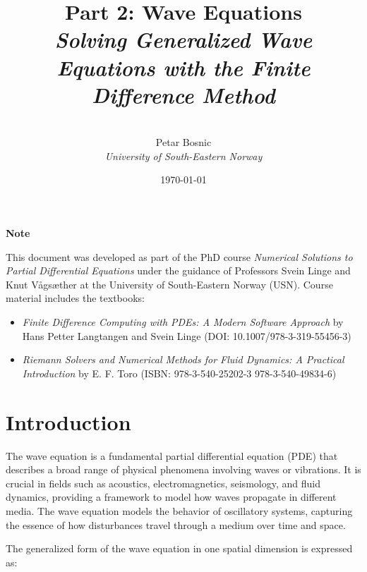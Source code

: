 \documentclass{article}
\title{\textbf{Part 2: Wave Equations
	} \\[0.5em]  %
	\large \textit{Solving Generalized Wave Equations with the Finite Difference Method} \\[2em]  %
}
\author{\\[15em]  %
	Petar Bosnic \\[0.5em] %
	\textit{University of South-Eastern Norway} \\[2em]  %
}
\date{\today}
\begin{document}
	
	\maketitle
	\thispagestyle{empty}  %
	
	\vspace{1cm}
	
	\begin{center}
		\textbf{Note}
	\end{center}
	
	\noindent
	This document was developed as part of the PhD course \textit{Numerical Solutions to Partial Differential Equations} under the guidance of Professors Svein Linge and Knut Vågsæther at the University of South-Eastern Norway (USN). Course material includes the textbooks:
	
	\begin{itemize}
		\item \textit{Finite Difference Computing with PDEs: A Modern Software Approach} by Hans Petter Langtangen and Svein Linge (DOI: 10.1007/978-3-319-55456-3)
		\item \textit{Riemann Solvers and Numerical Methods for Fluid Dynamics: A Practical Introduction} by E. F. Toro (ISBN: 978-3-540-25202-3 978-3-540-49834-6)
	\end{itemize}
	
	\vspace{1cm}
	
	\newpage  %
	
	\tableofcontents
	\newpage  %


	
	\section{Introduction}
	
		The wave equation is a fundamental partial differential equation (PDE) that describes a broad range of physical phenomena involving waves or vibrations. It is crucial in fields such as acoustics, electromagnetics, seismology, and fluid dynamics, providing a framework to model how waves propagate in different media. The wave equation models the behavior of oscillatory systems, capturing the essence of how disturbances travel through a medium over time and space. 
		
		The generalized form of the wave equation in one spatial dimension is expressed as:
		
\end{document}
